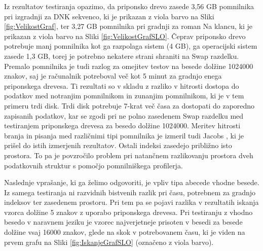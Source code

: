 Iz rezultatov testiranja opazimo, da priponsko drevo zasede 3,56 GB pomnilnika pri izgradnji za DNK sekvenco, ki je prikazan z viola barvo na Sliki \ref{fig:VelikostGraf}, ter 3,27 GB pomnilnika pri gradnji za roman Na klancu, ki je prikazan z viola barvo na Sliki \ref{fig:VelikostGrafSLO}. Čeprav priponsko drevo potrebuje manj pomnilnika kot ga razpolaga sistem (4 GB), ga operacijski sistem zasede 1,3 GB, torej je potrebno nekatere strani shraniti na Swap razdelku. Premalo pomnilnika je tudi razlog za omejitev testov na besede dolžine 1024000 znakov, saj je računalnik potreboval več kot 5 minut za gradnjo enega priponskega drevesa. Ti rezultati so v skladu z razliko v hitrosti dostopa do podatkov med notranjim pomnilnikom in zunanjim pomnilnikom, ki je v tem primeru trdi disk. Trdi disk potrebuje 7-krat več časa za dostopati do zaporedno zapisanih podatkov, kar se zgodi pri ne polno zasedenem Swap razdelku med testiranjem priponskega drevesa za besedo dolžine 1024000. Meritev hitrosti branja in pisanja med različnimi tipi pomnilnika je izmeril tudi Jacobs \cite{Jacobs2009}, ki je prišel do istih izmerjenih rezultatov. Ostali indeksi zasedejo približno isto prostora. To pa je povzročilo problem pri natančnem razlikovanju prostora dveh podatkovnih struktur s pomočjo pomnilniškega profilerja.

Naslednje vprašanje, ki ga želimo odgovoriti, je vpliv tipa abecede vhodne besede. Iz samega testiranja ni razvidnih bistvenih razlik pri času, potrebnem za gradnjo indeksov ter zasedenem prostoru. Pri tem pa se pojavi razlika v rezultatih iskanja vzorca dolžine 5 znakov z uporabo priponskega drevesa. Pri testiranju z vhodno besedo v naravnem jeziku je vzorec najverjetneje prisoten v besedi za besede dolžine vsaj 16000 znakov, glede na skok v potrebovanem času, ki je viden na prvem grafu na Sliki \ref{fig:IskanjeGrafSLO} (označeno z viola barvo).

